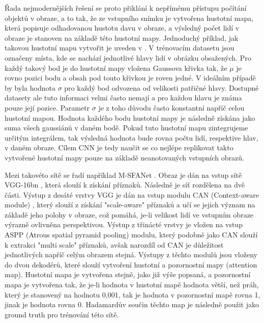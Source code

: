 Řada nejmodernějších řešení se proto přiklání k nepřímému přístupu počítání objektů v obraze, a to tak, že ze vstupního snímku je vytvořena hustotní mapa, která popisuje odhadovanou hustotu davu v obraze, a výsledný počet lidí v obraze je stanoven na základě této hustotní mapy.
Jednoduchý příklad, jak takovou hustotní mapu vytvořit je uveden v \cite{DeepCorn, Boominathan}.
V trénovacím datasetu jsou označeny místa, kde se nachází jednotlivé hlavy lidí v obrázku obsažených.
Pro každý takový bod je do hustotní mapy vložena Gaussova křivka tak, že \(\mu\) je rovno pozici bodu a obsah pod touto křivkou je roven jedné.
V ideálním případě by byla hodnota \(\sigma\) pro každý bod odvozena od velikosti patřičné hlavy.
Dostupné datasety ale tuto informaci velmi často nemají a pro každou hlavu je známa pouze její pozice. Parametr \(\sigma\) je z toho důvodu často konstantní napříč celou hustotní mapou.
Hodnota každého bodu hustotní mapy je následně získána jako suma všech gaussiánů v daném bodě.
Pokud tuto hustotní mapu zintegrujeme určitým integrálem, tak výsledná hodnota bude rovna počtu lidí, respektive hlav, v daném obraze.
Cílem CNN je tedy naučit se co nejlépe replikovat takto vytvořené hustotní mapy pouze na základě neanotovaných vstupních obrazů.

Mezi takovéto sítě se řadí například M-SFANet \cite{MSFANet_for_crowd_counting}.
Obraz je dán na vstup sítě VGG-16bn \cite{VGG}, která slouží k získání příznaků.
Následně je síť rozdělena na dvě části.
Výstup z desáté vrstvy VGG je dán na vstup modulu CAN (Context-aware module) \cite{CAN_1, CAN_2}, který slouží z získání "scale-aware" příznaků a učí se jejich význam na základě jeho polohy v obraze, což pomáhá, je-li velikost lidí ve vstupním obraze výrazně ovlivněna perspektivou.
Výstup z třinácté vrstvy je vložen na vstup ASPP \cite{ASPP} (Atrous spatial pyramid pooling) modulu, který podobně jako CAN slouží k extrakci "multi scale" příznaků, avšak narozdíl od CAN je důležitost jednotlivých napříč celým obrazem stejná.
Výstupy z těchto modulů jsou vloženy do dvou dekodérů, které slouží vytvoření hustotní a pozornostní mapy (attention map).
Hustotní mapa je vytvořena stejně, jako již výše popsaná, a pozornostní mapa je vytvořena tak, že je-li hodnota v hustotní mapě hodnota větší, než práh, který je stanovený na hodnotu 0,001, tak je hodnota v pozornostní mapě rovna 1, jinak je hodnota rovna 0.
Hadamardův součin těchto map je následně použit jako ground truth pro trénování této sítě.

